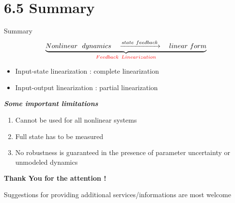 \documentclass{beamer}
\begin{document}
\section{6.5  Summary}

\begin{frame}{Summary}
    $$
    \underbrace{Nonlinear~~dynamics \quad \xrightarrow{state~feedback} \quad linear~form }_{\color{red}\large{Feedback ~Linearization}}
    $$
    \begin{itemize}
      \item {\color{red}Input-state linearization} : complete linearization
      \item {\color{red}Input-output linearization} : partial linearization
    \end{itemize}
    
    \textit{\textbf{Some important limitations}}
    \begin{enumerate}
      \item Cannot be used for all nonlinear systems
      \item Full state has to be measured
      \item No robustness is guaranteed in the presence of parameter uncertainty or unmodeled dynamics
    \end{enumerate}
\end{frame}

\begin{frame}[c]
       \centering
       \textbf{\Large Thank You for the attention !}
    
    \vspace{+30pt}
    \centering
       {\footnotesize Suggestions for providing additional services/informations are most welcome}
\end{frame}
\end{document}
